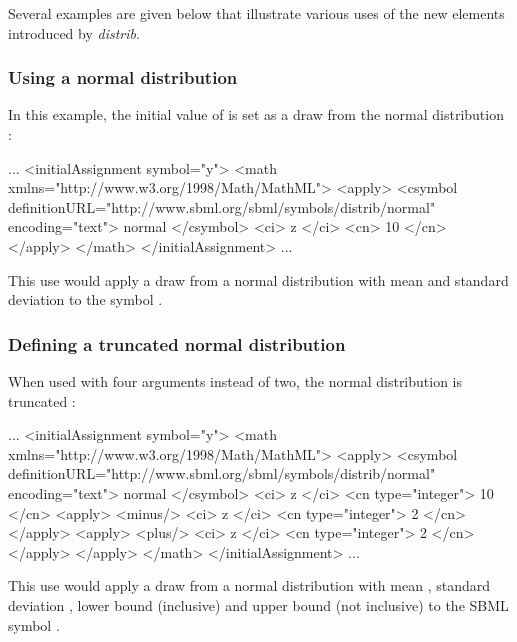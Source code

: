 \documentclass[draftspec]{sbmlpkgspec}
\newcommand{\distribshort}{\emph{distrib}\xspace}
\begin{document}
Several examples are given below that illustrate various uses of the new  elements introduced by \distribshort.

\subsubsection{Using a normal distribution}

In this example, the initial value of  is set as a draw from the normal distribution :

\begin{example}
...
  <initialAssignment symbol="y">
    <math xmlns="http://www.w3.org/1998/Math/MathML">
      <apply>
        <csymbol definitionURL="http://www.sbml.org/sbml/symbols/distrib/normal"
                 encoding="text"> normal </csymbol>
        <ci> z </ci>
        <cn> 10 </cn>
      </apply>
    </math>
  </initialAssignment>
...
\end{example}

This use would apply a draw from a normal distribution with mean  and standard deviation  to the symbol .

\subsubsection{Defining a truncated normal distribution}

When used with four arguments instead of two, the normal distribution is truncated :

\begin{example}
...
  <initialAssignment symbol="y">
    <math xmlns="http://www.w3.org/1998/Math/MathML">
      <apply>
        <csymbol definitionURL="http://www.sbml.org/sbml/symbols/distrib/normal"
                 encoding="text"> normal </csymbol>
        <ci> z </ci>
        <cn type="integer"> 10 </cn>
        <apply>
          <minus/>
          <ci> z </ci>
          <cn type="integer"> 2 </cn>
        </apply>
        <apply>
          <plus/>
          <ci> z </ci>
          <cn type="integer"> 2 </cn>
        </apply>
      </apply>
    </math>
  </initialAssignment>
...
\end{example}

This use would apply a draw from a normal distribution with mean , standard deviation , lower bound  (inclusive) and upper bound  (not inclusive) to the SBML symbol .
\end{document}
